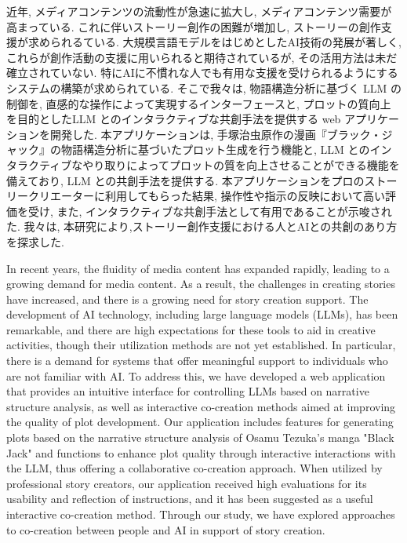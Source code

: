 近年, メディアコンテンツの流動性が急速に拡大し, メディアコンテンツ需要が高まっている. これに伴いストーリー創作の困難が増加し, ストーリーの創作支援が求められるている. 大規模言語モデルをはじめとしたAI技術の発展が著しく, これらが創作活動の支援に用いられると期待されているが, その活用方法は未だ確立されていない. 特にAIに不慣れな人でも有用な支援を受けられるようにするシステムの構築が求められている. そこで我々は, 物語構造分析に基づく LLM の制御を, 直感的な操作によって実現するインターフェースと, プロットの質向上を目的としたLLM とのインタラクティブな共創手法を提供する web アプリケーションを開発した. 本アプリケーションは, 手塚治虫原作の漫画『ブラック・ジャック』の物語構造分析に基づいたプロット生成を行う機能と, LLM とのインタラクティブなやり取りによってプロットの質を向上させることができる機能を備えており, LLM との共創手法を提供する. 本アプリケーションをプロのストーリークリエーターに利用してもらった結果, 操作性や指示の反映において高い評価を受け, また, インタラクティブな共創手法として有用であることが示唆された. 我々は, 本研究により,ストーリー創作支援における人とAIとの共創のあり方を探求した.

In recent years, the fluidity of media content has expanded rapidly, leading to a growing demand for media content. As a result, the challenges in creating stories have increased, and there is a growing need for story creation support. The development of AI technology, including large language models (LLMs), has been remarkable, and there are high expectations for these tools to aid in creative activities, though their utilization methods are not yet established. In particular, there is a demand for systems that offer meaningful support to individuals who are not familiar with AI. To address this, we have developed a web application that provides an intuitive interface for controlling LLMs based on narrative structure analysis, as well as interactive co-creation methods aimed at improving the quality of plot development. Our application includes features for generating plots based on the narrative structure analysis of Osamu Tezuka's manga "Black Jack" and functions to enhance plot quality through interactive interactions with the LLM, thus offering a collaborative co-creation approach. When utilized by professional story creators, our application received high evaluations for its usability and reflection of instructions, and it has been suggested as a useful interactive co-creation method. Through our study, we have explored approaches to co-creation between people and AI in support of story creation.

